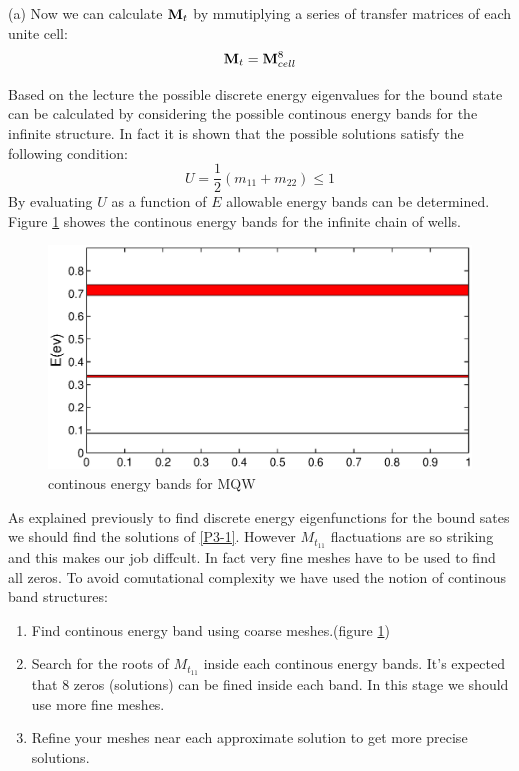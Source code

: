 \begin{homeworkProblem}
\begin{homeworkSection}{(a)}
Now we can calculate $\mathbf{M}_t$ by mmutiplying a series of transfer matrices of each unite cell:
\begin{equation}  
\mathbf{M}_t=\mathbf{M}_{cell}^{8}
\end{equation}

Based on the lecture the possible discrete energy eigenvalues for the bound state can be calculated by considering the possible continous energy bands for the infinite structure. In fact it is shown that the possible solutions satisfy the following condition:
\begin{equation}
U=\frac{1}{2}\left(m_{11}+m_{22}\right)\leq 1
\end{equation}
By evaluating $U$ as a function of $E$ allowable energy bands can be determined. Figure \ref{fig-P3-band} showes the continous energy bands for the infinite chain of wells.
\begin{figure}[h]
\centering
\includegraphics[scale=0.7]{energyband.eps}
\caption{continous energy bands for MQW}
\label{fig-P3-band}
\end{figure}
As explained previously to find discrete energy eigenfunctions for the bound sates we should find the solutions of \eqref{P3-1}. However $M_t_{11}$ flactuations are so striking and this makes our job diffcult. In fact  very fine meshes have to be used to find all zeros. To avoid comutational complexity we have used the notion of continous band structures:
\begin{enumerate}
\item
Find continous energy band using coarse meshes.(figure \ref{fig-P3-band})
\item
Search for the roots of $M_t_{11}$ inside each continous energy bands. It's expected that 8 zeros (solutions) can be fined inside each band. In this stage we should use more fine meshes.
\item
Refine your meshes near each approximate solution to get more precise solutions.

\end{enumerate}
\end{homeworkSection}
\end{homeworkProblem}
